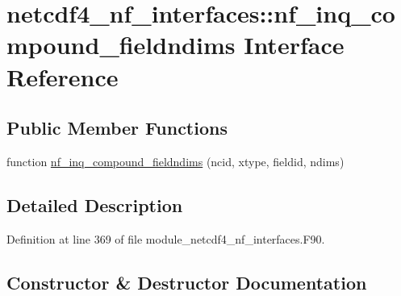 \hypertarget{interfacenetcdf4__nf__interfaces_1_1nf__inq__compound__fieldndims}{}\section{netcdf4\+\_\+nf\+\_\+interfaces\+:\+:nf\+\_\+inq\+\_\+compound\+\_\+fieldndims Interface Reference}
\label{interfacenetcdf4__nf__interfaces_1_1nf__inq__compound__fieldndims}
\subsection*{Public Member Functions}
\begin{DoxyCompactItemize}
\item 
function \hyperlink{interfacenetcdf4__nf__interfaces_1_1nf__inq__compound__fieldndims_ad420f0a457c6d082c937ebbb71b1054a}{nf\+\_\+inq\+\_\+compound\+\_\+fieldndims} (ncid, xtype, fieldid, ndims)
\end{DoxyCompactItemize}


\subsection{Detailed Description}


Definition at line 369 of file module\+\_\+netcdf4\+\_\+nf\+\_\+interfaces.\+F90.



\subsection{Constructor \& Destructor Documentation}
\mbox{\label{interfacenetcdf4__nf__interfaces_1_1nf__inq__compound__fieldndims_ad420f0a457c6d082c937ebbb71b1054a}} 
